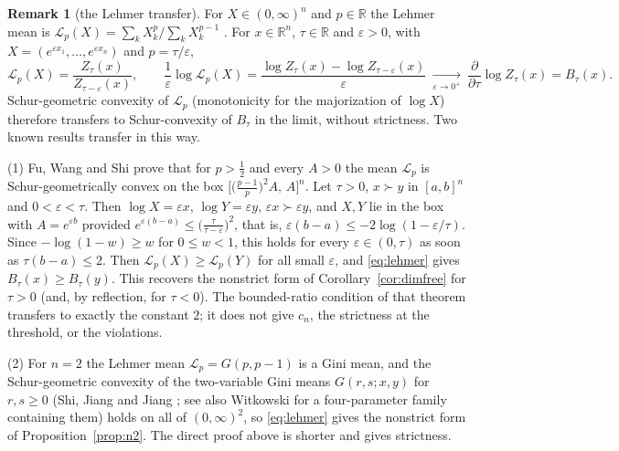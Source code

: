 \documentclass[11pt,a4paper]{article}
\theoremstyle{plain}
\theoremstyle{definition}
\newtheorem{remark}[theorem]{Remark}
\newcommand{\R}{\mathbb{R}}
\newcommand{\maj}{\succ}
\begin{document}
\begin{remark}[the Lehmer transfer]\label{rem:lehmer}
For $X\in(0,\infty)^n$ and $p\in\R$ the Lehmer mean is $\mathcal{L}_p(X)=\sum_k X_k^{p}/\sum_k X_k^{p-1}$ \cite{Lehmer1971,Bullen2003}. For $x\in\R^n$, $\tau\in\R$ and $\varepsilon>0$, with $X=(e^{\varepsilon x_1},\dots,e^{\varepsilon x_n})$ and $p=\tau/\varepsilon$,
\begin{equation}\label{eq:lehmer}
\mathcal{L}_{p}(X)=\frac{Z_\tau(x)}{Z_{\tau-\varepsilon}(x)},\qquad
\frac{1}{\varepsilon}\log \mathcal{L}_{p}(X)=\frac{\log Z_\tau(x)-\log Z_{\tau-\varepsilon}(x)}{\varepsilon}\ \xrightarrow[\varepsilon\to 0^+]{}\ \frac{\partial}{\partial\tau}\log Z_\tau(x)=B_\tau(x).
\end{equation}
Schur-geometric convexity of $\mathcal{L}_p$ (monotonicity for the majorization of $\log X$) therefore transfers to Schur-convexity of $B_\tau$ in the limit, without strictness. Two known results transfer in this way.

(1) Fu, Wang and Shi \cite[Theorem~1.4(II)]{FuWangShi2016} prove that for $p>\frac12$ and every $A>0$ the mean $\mathcal{L}_p$ is Schur-geometrically convex on the box $\bigl[\bigl(\tfrac{p-1}{p}\bigr)^2A,\,A\bigr]^n$. Let $\tau>0$, $x\maj y$ in $[a,b]^n$ and $0<\varepsilon<\tau$. Then $\log X=\varepsilon x$, $\log Y=\varepsilon y$, $\varepsilon x\maj\varepsilon y$, and $X,Y$ lie in the box with $A=e^{\varepsilon b}$ provided $e^{\varepsilon(b-a)}\le\bigl(\tfrac{\tau}{\tau-\varepsilon}\bigr)^2$, that is, $\varepsilon(b-a)\le-2\log(1-\varepsilon/\tau)$. Since $-\log(1-w)\ge w$ for $0\le w<1$, this holds for every $\varepsilon\in(0,\tau)$ as soon as $\tau(b-a)\le 2$. Then $\mathcal{L}_p(X)\ge \mathcal{L}_p(Y)$ for all small $\varepsilon$, and \eqref{eq:lehmer} gives $B_\tau(x)\ge B_\tau(y)$. This recovers the nonstrict form of Corollary~\ref{cor:dimfree} for $\tau>0$ (and, by reflection, for $\tau<0$). The bounded-ratio condition of that theorem transfers to exactly the constant $2$; it does not give $c_n$, the strictness at the threshold, or the violations.

(2) For $n=2$ the Lehmer mean $\mathcal{L}_p=G(p,p-1)$ is a Gini mean, and the Schur-geometric convexity of the two-variable Gini means $G(r,s;x,y)$ for $r,s\ge 0$ (Shi, Jiang and Jiang \cite{ShiJiangJiang2009}; see also Witkowski \cite{Witkowski2011} for a four-parameter family containing them) holds on all of $(0,\infty)^2$, so \eqref{eq:lehmer} gives the nonstrict form of Proposition~\ref{prop:n2}. The direct proof above is shorter and gives strictness.
\end{remark}
\end{document}
